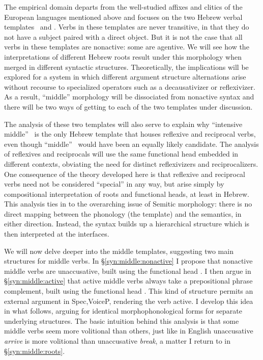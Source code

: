 The empirical domain departs from the well-studied affixes and clitics of the European languages mentioned above and focuses on the two Hebrew verbal templates \textbf{\tnif}~and \textbf{\thit}. Verbs in these templates are never transitive, in that they do not have a subject paired with a direct object. But it is not the case that all verbs in these templates are nonactive: some are agentive. We will see how the interpretations of different Hebrew roots result under this morphology when merged in different syntactic structures. Theoretically, the implications will be explored for a system in which different argument structure alternations arise without recourse to specialized operators such as a decausativizer or reflexivizer. As a result, ``middle'' morphology will be dissociated from nonactive syntax and there will be two ways of getting to each of the two templates under discussion.

The analysis of these two templates will also serve to explain why ``intensive middle'' \thit~is the only Hebrew template that houses reflexive and reciprocal verbs, even though ``middle'' \tnif~would have been an equally likely candidate. The analysis of reflexives and reciprocals will use the same functional head embedded in different contexts, obviating the need for distinct reflexivizers and reciprocalizers. One consequence of the theory developed here is that reflexive and reciprocal verbs need not be considered ``special'' in any way, but arise simply by compositional interpretation of roots and functional heads, at least in Hebrew. This analysis ties in to the overarching issue of Semitic morphology: there is no direct mapping between the phonology (the template) and the semantics, in either direction. Instead, the syntax builds up a hierarchical structure which is then interpreted at the interfaces.

We will now delve deeper into the middle templates, suggesting two main structures for middle verbs. In \S\ref{syn:middle:nonactive} I propose that nonactive middle verbs are unaccusative, built using the functional head \vz. I then argue in \S\ref{syn:middle:active} that active middle verbs always take a prepositional phrase complement, built using the functional head \pz. This kind of structure permits an external argument in Spec,VoiceP, rendering the verb active. I develop this idea in what follows, arguing for identical morphophonological forms for separate underlying structures. The basic intuition behind this analysis is that some middle verbs seem more volitional than others, just like in English unaccusative \emph{arrive} is more volitional than unaccusative \emph{break}, a matter I return to in \S\ref{syn:middle:roots}.




